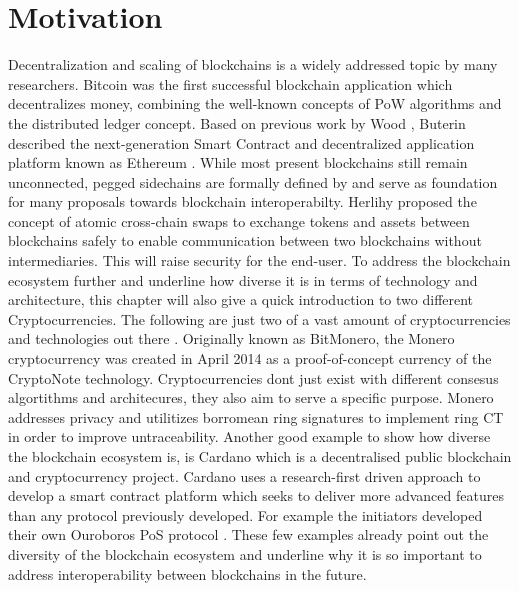 \section{Motivation}
\label{sec:intro:motivation}
Decentralization and scaling of blockchains is a widely addressed topic by
many researchers. Bitcoin \cite{nakamoto2008peer} was the first successful blockchain application
which decentralizes money, combining the well-known concepts of \ac{PoW} algorithms and the distributed ledger concept. Based on previous work
by Wood \cite{wood2014ethereum}, Buterin described the next-generation Smart Contract and decentralized
application platform known as Ethereum \cite{buterin2013ethereum} \cite{buterin2014ethereum}. While most present
blockchains still remain unconnected, pegged sidechains are formally defined
by \cite{back2014enabling} and serve as foundation for many proposals towards blockchain
interoperabilty. Herlihy proposed the concept of atomic cross-chain
swaps to exchange tokens and assets between blockchains safely \cite{herlihy2018atomic}
to enable communication between two blockchains without intermediaries. This will raise security for the end-user.
To address the blockchain ecosystem further and underline how diverse it is in terms of technology and architecture, this chapter will also give a quick introduction to two different Cryptocurrencies. The following are just two of a vast amount of cryptocurrencies and technologies out there .
Originally known as BitMonero, the Monero cryptocurrency was created in April 2014 \cite{alonso2020zero} as a proof-of-concept currency of the CryptoNote \cite{van2013cryptonote} technology.
Cryptocurrencies dont just exist with different consesus algortithms and architecures, they also aim to serve a specific purpose. Monero addresses privacy and utilitizes borromean ring signatures
\cite{maxwell2015borromean} to implement ring \ac{CT} \cite{noether2016ring} in order to improve untraceability.
Another good example to show how diverse the blockchain ecosystem is, is Cardano which is a decentralised public blockchain and cryptocurrency project. Cardano uses a research-first driven approach to develop a smart contract platform which seeks to deliver more advanced features than any protocol previously developed. For example the initiators developed their own Ouroboros \ac{PoS} protocol \cite{kiayias2017ouroboros}. These few examples already point out the diversity of the blockchain ecosystem and underline why it is so important to address interoperability between blockchains in the future.




